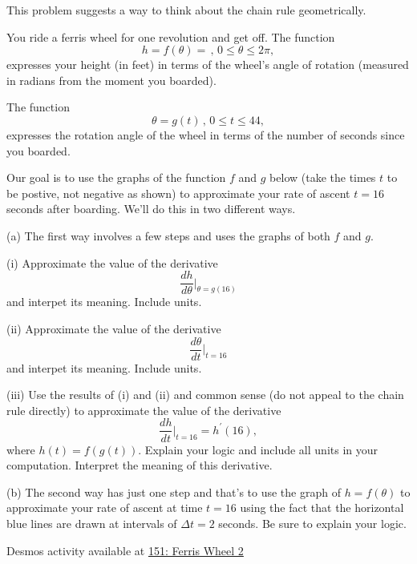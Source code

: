 \documentclass{ximera}
\begin{document}
\begin{question}  \label{Ex:CHdfthghhyhpp}
This problem suggests a way to think about the chain rule geometrically.

You ride a ferris wheel for one revolution and get off. The function 
\[
    h = f(\theta) = \, , \, 0\leq \theta \leq 2\pi ,   %
\]
expresses your height (in feet) in terms of the wheel's angle of rotation (measured in radians from the moment you boarded).

The function 
\[
    \theta = g(t) \, , \, 0\leq t \leq 44, 
\]
expresses the rotation angle of the wheel in terms of the number of seconds since  you boarded.

Our goal is to use the graphs of the function $f$ and $g$ below (take the times $t$ to be postive, not negative as shown) to approximate your rate of ascent $t=16$ seconds after boarding. We'll do this in two different ways.

(a) The first way involves a few steps and uses the graphs of both $f$ and $g$. 

(i) Approximate the value of the derivative
\[
   \frac{dh}{d\theta}\Big|_{\theta = g(16)} 
\]
and interpet its meaning. Include units.

(ii) Approximate the value of the derivative 
\[
    \frac{d\theta}{dt}\Big|_{t=16} 
\]
and interpet its meaning. Include units.

(iii) Use the results of (i) and (ii) and common sense (do not appeal to the chain rule directly) to approximate the value of the derivative
\[
   \frac{dh}{dt}\Big|_{t=16}  =  h^\prime(16),
\]
where $h(t) = f(g(t))$. Explain your logic and include all units in your computation. Interpret the meaning of this derivative.

(b) The second way has just one step and that's to use the graph of $h=f(\theta)$ to approximate your rate of ascent at time $t=16$ using the fact that the horizontal blue lines are drawn at intervals of $\Delta t = 2$ seconds. Be sure to explain your logic.


\begin{onlineOnly}
    \begin{center}
\end{center}
\end{onlineOnly}

Desmos activity available at \href{https://www.desmos.com/calculator/fkgfpsowe8}{151: Ferris Wheel 2}

\end{question}
\end{document}
